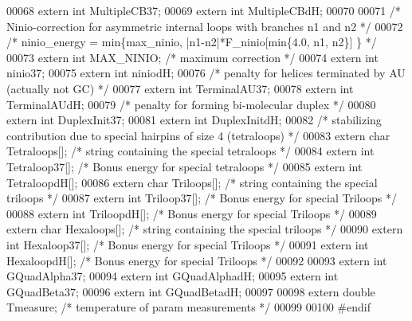 \begin{DoxyCode}
00068 \textcolor{keyword}{extern} \textcolor{keywordtype}{int} MultipleCB37;
00069 \textcolor{keyword}{extern} \textcolor{keywordtype}{int} MultipleCBdH;
00070 
00071 \textcolor{comment}{/* Ninio-correction for asymmetric internal loops with branches n1 and n2 */}
00072 \textcolor{comment}{/*    ninio\_energy = min\{max\_ninio, |n1-n2|*F\_ninio[min\{4.0, n1, n2\}] \} */}
00073 \textcolor{keyword}{extern} \textcolor{keywordtype}{int}  MAX\_NINIO;                   \textcolor{comment}{/* maximum correction */}
00074 \textcolor{keyword}{extern} \textcolor{keywordtype}{int} ninio37;
00075 \textcolor{keyword}{extern} \textcolor{keywordtype}{int} niniodH;
00076 \textcolor{comment}{/* penalty for helices terminated by AU (actually not GC) */}
00077 \textcolor{keyword}{extern} \textcolor{keywordtype}{int} TerminalAU37;
00078 \textcolor{keyword}{extern} \textcolor{keywordtype}{int} TerminalAUdH;
00079 \textcolor{comment}{/* penalty for forming bi-molecular duplex */}
00080 \textcolor{keyword}{extern} \textcolor{keywordtype}{int} DuplexInit37;
00081 \textcolor{keyword}{extern} \textcolor{keywordtype}{int} DuplexInitdH;
00082 \textcolor{comment}{/* stabilizing contribution due to special hairpins of size 4 (tetraloops) */}
00083 \textcolor{keyword}{extern} \textcolor{keywordtype}{char} Tetraloops[];  \textcolor{comment}{/* string containing the special tetraloops */}
00084 \textcolor{keyword}{extern} \textcolor{keywordtype}{int}  Tetraloop37[];  \textcolor{comment}{/* Bonus energy for special tetraloops */}
00085 \textcolor{keyword}{extern} \textcolor{keywordtype}{int}  TetraloopdH[];
00086 \textcolor{keyword}{extern} \textcolor{keywordtype}{char} Triloops[];    \textcolor{comment}{/* string containing the special triloops */}
00087 \textcolor{keyword}{extern} \textcolor{keywordtype}{int}  Triloop37[]; \textcolor{comment}{/* Bonus energy for special Triloops */}
00088 \textcolor{keyword}{extern} \textcolor{keywordtype}{int}  TriloopdH[]; \textcolor{comment}{/* Bonus energy for special Triloops */}
00089 \textcolor{keyword}{extern} \textcolor{keywordtype}{char} Hexaloops[];    \textcolor{comment}{/* string containing the special triloops */}
00090 \textcolor{keyword}{extern} \textcolor{keywordtype}{int}  Hexaloop37[]; \textcolor{comment}{/* Bonus energy for special Triloops */}
00091 \textcolor{keyword}{extern} \textcolor{keywordtype}{int}  HexaloopdH[]; \textcolor{comment}{/* Bonus energy for special Triloops */}
00092 
00093 \textcolor{keyword}{extern} \textcolor{keywordtype}{int} GQuadAlpha37;
00094 \textcolor{keyword}{extern} \textcolor{keywordtype}{int} GQuadAlphadH;
00095 \textcolor{keyword}{extern} \textcolor{keywordtype}{int} GQuadBeta37;
00096 \textcolor{keyword}{extern} \textcolor{keywordtype}{int} GQuadBetadH;
00097 
00098 \textcolor{keyword}{extern} \textcolor{keywordtype}{double} Tmeasure;       \textcolor{comment}{/* temperature of param measurements */}
00099 
00100 \textcolor{preprocessor}{#endif}
\end{DoxyCode}
